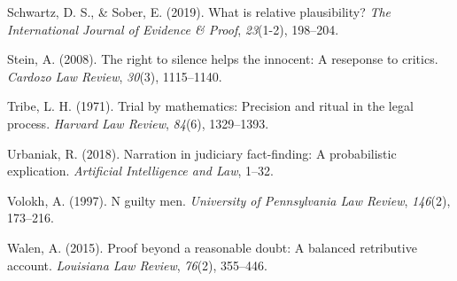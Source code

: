 \documentclass[10pt,dvipsnames]{scrartcl}
\begin{document}
\hypertarget{ref-schwartz2019WhatRelativePlausibility}{}
Schwartz, D. S., \& Sober, E. (2019). What is relative plausibility?
\emph{The International Journal of Evidence \& Proof}, \emph{23}(1-2),
198--204.

\hypertarget{ref-stein2008}{}
Stein, A. (2008). The right to silence helps the innocent: A reseponse
to critics. \emph{Cardozo Law Review}, \emph{30}(3), 1115--1140.

\hypertarget{ref-tribe71}{}
Tribe, L. H. (1971). Trial by mathematics: Precision and ritual in the
legal process. \emph{Harvard Law Review}, \emph{84}(6), 1329--1393.

\hypertarget{ref-Urbaniak2017Narration-in-ju}{}
Urbaniak, R. (2018). Narration in judiciary fact-finding: A
probabilistic explication. \emph{Artificial Intelligence and Law},
1--32.

\hypertarget{ref-voloch1997}{}
Volokh, A. (1997). N guilty men. \emph{University of Pennsylvania Law
Review}, \emph{146}(2), 173--216.

\hypertarget{ref-walen2015}{}
Walen, A. (2015). Proof beyond a reasonable doubt: A balanced
retributive account. \emph{Louisiana Law Review}, \emph{76}(2),
355--446.
\end{document}
